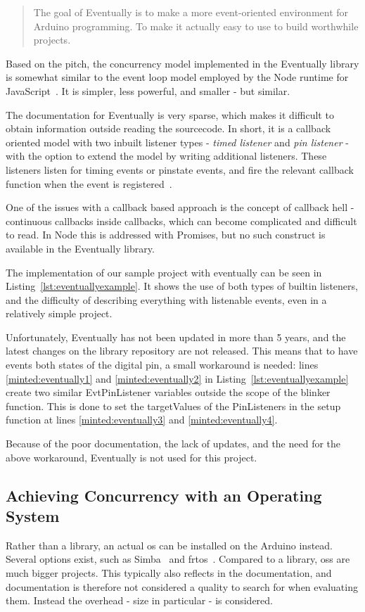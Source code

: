 \blockcquote{bartlettEventually2022Bartlett}{The goal of Eventually is to make a more event-oriented environment for Arduino programming. To make it actually easy to use to build worthwhile projects.}

Based on the pitch, the concurrency model implemented in the Eventually library is somewhat similar to the event loop model employed by the Node runtime for JavaScript~\cite{NodeJSdocs}. It is simpler, less powerful, and smaller - but similar.

The documentation for Eventually is very sparse, which makes it difficult to obtain information outside reading the sourcecode. In short, it is a callback oriented model with two inbuilt listener types - \textit{timed listener} and \textit{pin listener} - with the option to extend the model by writing additional listeners. These listeners listen for timing events or pinstate events, and fire the relevant callback function when the event is registered~\cite{bartlettEventually2022Bartlett}.

One of the issues with a callback based approach is the concept of callback hell - continuous callbacks inside callbacks, which can become complicated and difficult to read. In Node this is addressed with Promises, but no such construct is available in the Eventually library.

The implementation of our sample project with eventually can be seen in Listing~\ref{lst:eventuallyexample}. It shows the use of both types of builtin listeners, and the difficulty of describing everything with listenable events, even in a relatively simple project.

Unfortunately, Eventually has not been updated in more than 5 years, and the latest changes on the library repository are not released. This means that to have events both states of the digital pin, a small workaround is needed: lines \ref{minted:eventually1} and \ref{minted:eventually2} in Listing~\ref{lst:eventuallyexample} create two similar EvtPinListener variables outside the scope of the blinker function. This is done to set the targetValues of the PinListeners in the setup function at lines \ref{minted:eventually3} and \ref{minted:eventually4}.

Because of the poor documentation, the lack of updates, and the need for the above workaround, Eventually is not used for this project.


\subsection{Achieving Concurrency with an Operating System}\label{subsec:arduinoos}
Rather than a library, an actual \gls{os} can be installed on the Arduino instead. Several options exist, such as Simba~\cite{SimbaOS} and \gls{frtos}~\cite{AboutRTOS}. Compared to a library, \glspl{os} are much bigger projects. This typically also reflects in the documentation, and documentation is therefore not considered a quality to search for when evaluating them. Instead the overhead - size in particular - is considered.

